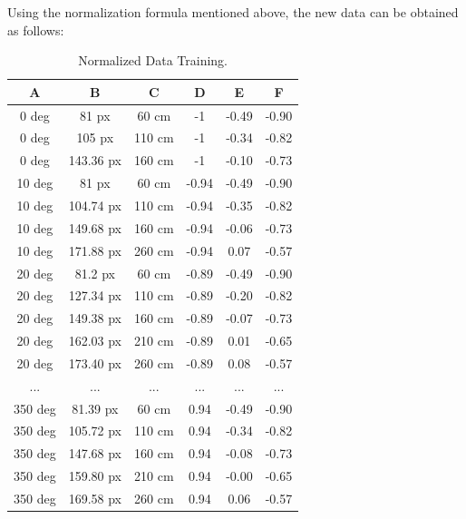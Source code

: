
Using the normalization formula mentioned above, the new data can be obtained as follows: 

\begin{table}[H]
  \caption{Normalized Data Training.}
  \begin{center}
  \begin{tabular}{|c|c|c|c|c|c|}
    \hline
    \rowcolor[HTML]{C0C0C0}
    \textbf{A} & \textbf{B} & \textbf{C} & \textbf{D} & \textbf{E} & \textbf{F} \\
    \hline
    0 deg            & 81 px                & 60 cm            & -1 & -0.49 & -0.90 \\
    0 deg            & 105 px                & 110 cm            & -1 & -0.34 & -0.82 \\
    0 deg           & 143.36 px                & 160 cm            & -1 & -0.10 & -0.73 \\
    10 deg           & 81 px                & 60 cm           & -0.94 & -0.49 & -0.90 \\
    10 deg           & 104.74 px                & 110 cm           & -0.94 & -0.35 & -0.82 \\
    10 deg           & 149.68 px                & 160 cm           & -0.94 & -0.06 & -0.73 \\
    10 deg           & 171.88 px                & 260 cm           & -0.94 & 0.07 & -0.57 \\
    20 deg           & 81.2 px                & 60 cm           & -0.89 & -0.49 & -0.90 \\
    20 deg           & 127.34 px                & 110 cm           & -0.89 & -0.20 & -0.82 \\
    20 deg           & 149.38 px                & 160 cm           & -0.89 & -0.07 & -0.73 \\
    20 deg           & 162.03 px                & 210 cm           & -0.89 & 0.01 & -0.65 \\
    20 deg           & 173.40 px                & 260 cm           & -0.89 & 0.08 & -0.57 \\
    ...           & ...                & ...           & ... & ... & ... \\
    350 deg           & 81.39 px                & 60 cm           & 0.94 & -0.49 & -0.90 \\
    350 deg           & 105.72 px                & 110 cm           & 0.94 & -0.34 & -0.82 \\
    350 deg           & 147.68 px                & 160 cm           & 0.94 & -0.08 & -0.73 \\
    350 deg           & 159.80 px                & 210 cm           & 0.94 & -0.00 & -0.65 \\
    350 deg           & 169.58 px                & 260 cm           & 0.94 & 0.06 & -0.57 \\
    \hline
  \end{tabular}
  \label{tab2}
  \end{center}
\end{table}

